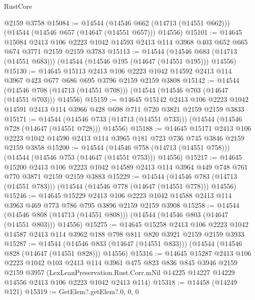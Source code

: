 \begin{lexlean}{RustCore}
\begin{coremodule}
    @2159
    @3758
@15084 := @14544
    (@14546 @662 (@14713 (@14551 @662)))
    (@14544 (@14546 @657 (@14647 (@14551 @657))) @14556)
@15101 := @14645
    @15084
    @2413
    @106
    @2223
    @1042
    @14593
    @2413
    @114
    @3968
    @403
    @652
    @665
    @674
    @3771
    @2159
    @2159
    @3783
@15113 := @14544
    (@14546 @683 (@14713 (@14551 @683)))
    (@14544 (@14546 @195 (@14647 (@14551 @195))) @14556)
@15130 := @14645
    @15113
    @2413
    @106
    @2223
    @1042
    @14592
    @2413
    @114
    @3967
    @423
    @677
    @686
    @695
    @3796
    @2159
    @2159
    @3808
@15142 := @14544
    (@14546 @708 (@14713 (@14551 @708)))
    (@14544 (@14546 @703 (@14647 (@14551 @703))) @14556)
@15159 := @14645
    @15142
    @2413
    @106
    @2223
    @1042
    @14591
    @2413
    @114
    @3966
    @428
    @698
    @711
    @720
    @3821
    @2159
    @2159
    @3833
@15171 := @14544
    (@14546 @733 (@14713 (@14551 @733)))
    (@14544 (@14546 @728 (@14647 (@14551 @728))) @14556)
@15188 := @14645
    @15171
    @2413
    @106
    @2223
    @1042
    @14590
    @2413
    @114
    @3965
    @181
    @723
    @736
    @745
    @3846
    @2159
    @2159
    @3858
@15200 := @14544
    (@14546 @758 (@14713 (@14551 @758)))
    (@14544 (@14546 @753 (@14647 (@14551 @753))) @14556)
@15217 := @14645
    @15200
    @2413
    @106
    @2223
    @1042
    @14589
    @2413
    @114
    @3964
    @449
    @748
    @761
    @770
    @3871
    @2159
    @2159
    @3883
@15229 := @14544
    (@14546 @783 (@14713 (@14551 @783)))
    (@14544 (@14546 @778 (@14647 (@14551 @778))) @14556)
@15246 := @14645
    @15229
    @2413
    @106
    @2223
    @1042
    @14588
    @2413
    @114
    @3963
    @469
    @773
    @786
    @795
    @3896
    @2159
    @2159
    @3908
@15258 := @14544
    (@14546 @808 (@14713 (@14551 @808)))
    (@14544 (@14546 @803 (@14647 (@14551 @803))) @14556)
@15275 := @14645
    @15258
    @2413
    @106
    @2223
    @1042
    @14587
    @2413
    @114
    @3962
    @188
    @798
    @811
    @820
    @3921
    @2159
    @2159
    @3933
@15287 := @14544
    (@14546 @833 (@14647 (@14551 @833)))
    (@14544 (@14546 @828 (@14647 (@14551 @828))) @14556)
@15316 := @14645
    @15287
    @2413
    @106
    @2223
    @1042
    @103
    @2413
    @114
    @3961
    @475
    @823
    @836
    @845
    @3946
    @2159
    @2159
    @3957
    (LexLeanPreservation.Rust.Corr.mNil
      @14225
      @14227
      @14229
      @14556
      @2413
      @106
      @2223
      @1042
      @2413
      @114)
@15318 := @14458 (@14249 @121)
@15319 := GetElem?.getElem?.{0, 0, 0}

\end{coremodule}
\end{lexlean}
